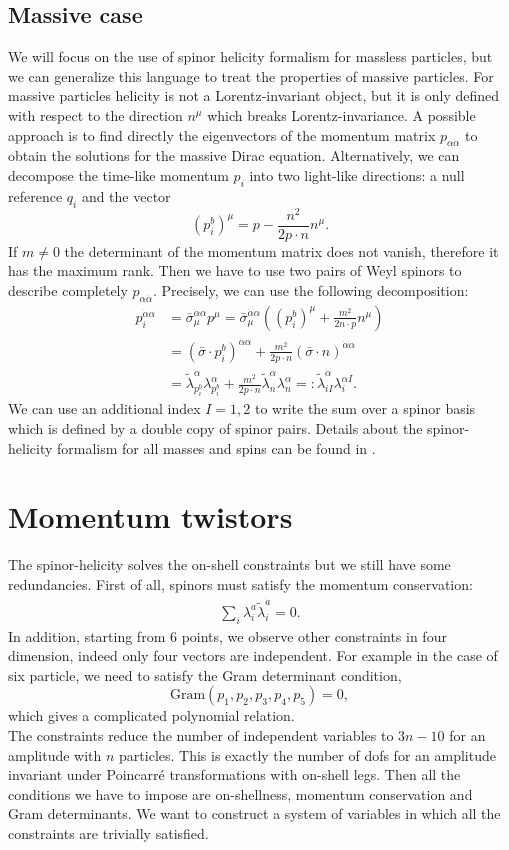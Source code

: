 \subsection{Massive case}
We will focus on the use of spinor helicity formalism for massless particles, but we can generalize this language to treat the properties of massive particles. For massive particles helicity is not a Lorentz-invariant object, but it is only defined with respect to the direction $n^\mu$ which breaks Lorentz-invariance. A possible approach is to find directly the eigenvectors of the momentum matrix $p_{\alpha\dot\alpha}$ to obtain the solutions for the massive Dirac equation. Alternatively, we can decompose the time-like momentum $p_i$ into two light-like directions: a null reference $q_i$ and the vector $$(p_i^b)^\mu=p-\frac{n^2}{2p\cdot n} n^\mu.$$
If $m\not=0$ the determinant of the momentum matrix does not vanish, therefore it has the maximum rank. Then we have to use two pairs of Weyl spinors to describe completely $p_{\alpha\dot\alpha}$. Precisely, we can use the following decomposition:
\begin{align*}
	p_i^{\dot\alpha \alpha}&=\bar \sigma_{\mu}^{\dot\alpha\alpha}p^\mu=\bar \sigma_{\mu}^{\dot\alpha\alpha}\left((p^b_i)^\mu+\frac{m^2}{2 n\cdot p}n^\mu\right)\\
	&=(\bar\sigma\cdot p^b_i)^{\dot\alpha\alpha}+\frac{m^2}{2p\cdot n}(\bar\sigma\cdot n)^{\dot\alpha\alpha}\\
	&=\tilde \lambda_{p^b_i}^{\dot\alpha}\lambda_{p^b_i}^{\alpha}+\frac{m^2}{2p\cdot n}\tilde \lambda_{n}^{\dot\alpha}\lambda_{n}^{\alpha}=:\tilde\lambda_{iI}^{\dot\alpha} \lambda_i^{\alpha I}.
\end{align*}
We can use an additional index $I=1,2$ to write the sum over a spinor basis which is defined by a double copy of spinor pairs. Details about the spinor-helicity formalism for all masses and spins can be found in \cite{Arkani-Hamed:2017jhn}.
\fi
\section{Momentum twistors} \label{momtw}
The spinor-helicity solves the on-shell constraints but we still have some redundancies. First of all, spinors must satisfy the momentum conservation:
\begin{align}
	\sum_i \lambda_i^a \tilde \lambda_i^{\dot a}=0.	\label{momcons}
\end{align}
In addition, starting from $6$ points, we observe other constraints in four dimension, indeed only four vectors are independent. For example in the case of six particle, we need to satisfy the Gram determinant condition,
$$
	\text{Gram}(p_1,p_2,p_3, p_4, p_5)=0,
$$
which gives a complicated polynomial relation.\\
The constraints reduce the number of independent variables to $3n-10$ for an amplitude with $n$ particles. This is exactly the number of dofs for an amplitude invariant under Poincarr\'e transformations with on-shell legs. Then all the conditions we have to impose are on-shellness, momentum conservation and Gram determinants. We want to construct a system of variables in which all the constraints are trivially satisfied.\\

